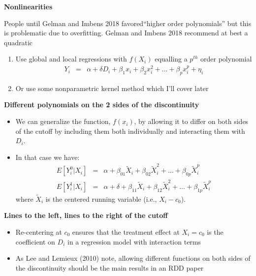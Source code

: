 \documentclass[notes=show]{beamer}
\begin{document}
\begin{frame}[plain]
\begin{center}
\textbf{Nonlinearities}
\end{center}

People until Gelman and Imbens 2018  favored``higher order polynomials'' but this is problematic due to overfitting. Gelman and Imbens 2018 recommend at best a quadratic
		\begin{enumerate}
		\item Use global and local regressions with $f(X_i)$ equalling a $p^{th}$ order polynomial 
		\begin{eqnarray*}
		Y_i&=&\alpha +\delta{D_i}  +  \beta_1x_i + \beta_2x_i^2 + \dots + \beta_px_i^p + \eta_i
		\end{eqnarray*}
		\item Or use some nonparametric kernel method which I'll cover later
		\end{enumerate}

\end{frame}

\begin{frame}[plain]
	\begin{center}
	\textbf{Different polynomials on the 2 sides of the discontinuity}
	\end{center}
	
	\begin{itemize}
	\item We can generalize the function, $f(x_i)$, by allowing it to differ on both sides of the cutoff by including them both individually and interacting them with $D_i$.  
	\item In that case we have:
		\begin{eqnarray*}
		E[Y_i^0 | X_i] &=& \alpha + \beta_{01}\tilde{X}_i + \beta_{02}\tilde{X}_i^2 + \dots + \beta_{0p}\tilde{X}_i^p \\
		E[Y_i^1 | X_i] &=& \alpha + \delta + \beta_{11}\tilde{X}_i + \beta_{12}\tilde{X}_i^2 + \dots + \beta_{1p}\tilde{X}_i^p
		\end{eqnarray*}where $\tilde{X}_i$ is the centered running variable (i.e., $X_i - c_0$). 
		
	\end{itemize}
\end{frame}


\begin{frame}[plain]
\begin{center}
\textbf{Lines to the left, lines to the right of the cutoff}
\end{center}

\begin{itemize}
		\item Re-centering at $c_0$ ensures that the treatment effect at $X_i=c_0$ is the coefficient on $D_i$ in a regression model with interaction terms
		\item As Lee and Lemieux (2010) note, allowing different functions on both sides of the discontinuity should be the main results in an RDD paper 
\end{itemize}

\end{frame}
\end{document}

